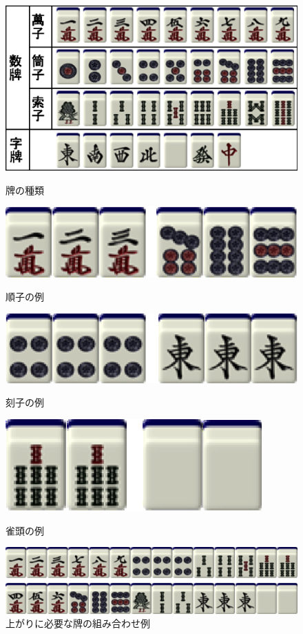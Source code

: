 \begin{figure}[p]
	\begin{center}
		\includegraphics{fig/hai.eps}
	\end{center}
	\caption{牌の種類}
	\label{hai}

	\begin{center}
		\includegraphics{fig/syuntu.eps}
	\end{center}
	\caption{順子の例}
	\label{syuntu}

	\begin{center}
		\includegraphics{fig/koutu.eps}
	\end{center}
	\caption{刻子の例}
	\label{koutu}

	\begin{center}
		\includegraphics{fig/zyantou.eps}
	\end{center}
	\caption{雀頭の例}
	\label{zyantou}

	\begin{center}
		\includegraphics{fig/agari.eps}
	\end{center}
	\caption{上がりに必要な牌の組み合わせ例}
	\label{agari}
\end{figure}

